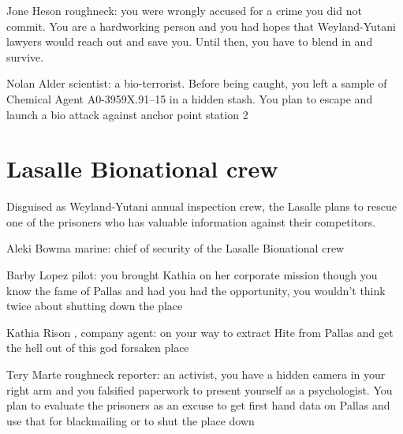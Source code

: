 \begin{rpg-commentbox}{Jone Heson}
    roughneck: you were wrongly accused for a crime you did not commit. You are a hardworking person and you had hopes that Weyland-Yutani lawyers would reach out and save you. Until then, you have to blend in and survive.
\end{rpg-commentbox}

\begin{rpg-commentbox}{Nolan Alder}
    scientist: a bio-terrorist. Before being caught, you left a sample of Chemical Agent A0-3959X.91–15 in a hidden stash. You plan to escape and launch a bio attack against anchor point station 2
\end{rpg-commentbox}

\newsect

\section{Lasalle Bionational crew}

Disguised as Weyland-Yutani annual inspection crew, the Lasalle plans to rescue one of the prisoners who has valuable information against their competitors.

\begin{rpg-commentbox}{Aleki Bowma}
    marine: chief of security of the Lasalle Bionational crew
    
\end{rpg-commentbox}


\begin{rpg-commentbox}{Barby Lopez}
    pilot: you brought Kathia on her corporate mission though you know the fame of Pallas and had you had the opportunity, you wouldn't think twice about shutting down the place
    
\end{rpg-commentbox}


\begin{rpg-commentbox}{Kathia Rison}
    , company agent: on your way to extract Hite from Pallas and get the hell out of this god forsaken place
    
\end{rpg-commentbox}


\begin{rpg-commentbox}{Tery Marte}
    roughneck reporter: an activist, you have a hidden camera in your right arm and you falsified paperwork to present yourself as a psychologist. You plan to evaluate the prisoners as an excuse to get first hand data on Pallas and use that for blackmailing or to shut the place down
\end{rpg-commentbox}

